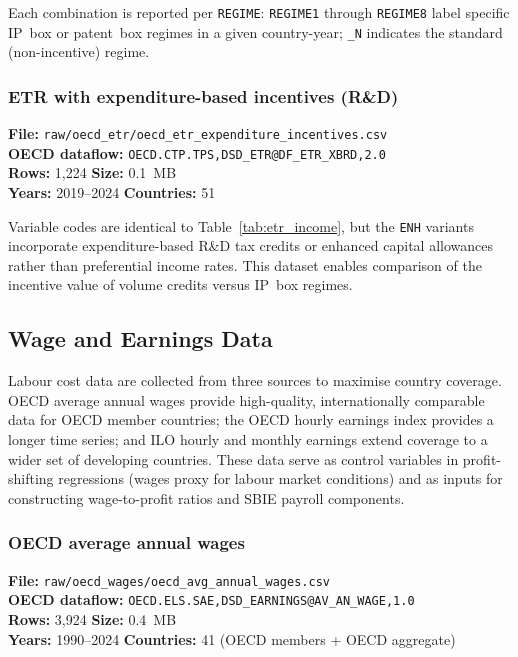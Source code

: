 \documentclass[11pt,a4paper]{article}
\begin{document}
Each combination is reported per \texttt{REGIME}: \texttt{REGIME1} through \texttt{REGIME8} label specific IP~box or patent~box regimes in a given country-year; \texttt{\_N} indicates the standard (non-incentive) regime.

\subsubsection{ETR with expenditure-based incentives (R\&D)}

\textbf{File:} \texttt{raw/oecd\_etr/oecd\_etr\_expenditure\_incentives.csv}\\
\textbf{OECD dataflow:} \texttt{OECD.CTP.TPS,DSD\_ETR@DF\_ETR\_XBRD,2.0}\\
\textbf{Rows:} 1{,}224 \quad \textbf{Size:} 0.1~MB\\
\textbf{Years:} 2019--2024 \quad \textbf{Countries:} 51

Variable codes are identical to Table~\ref{tab:etr_income}, but the \texttt{ENH} variants incorporate expenditure-based R\&D tax credits or enhanced capital allowances rather than preferential income rates.  This dataset enables comparison of the incentive value of volume credits versus IP~box regimes.



\subsection{Wage and Earnings Data}\label{sec:wages}

Labour cost data are collected from three sources to maximise country coverage. OECD average annual wages provide high-quality, internationally comparable data for OECD member countries; the OECD hourly earnings index provides a longer time series; and ILO hourly and monthly earnings extend coverage to a wider set of developing countries.  These data serve as control variables in profit-shifting regressions (wages proxy for labour market conditions) and as inputs for constructing wage-to-profit ratios and SBIE payroll components.

\subsubsection{OECD average annual wages}

\textbf{File:} \texttt{raw/oecd\_wages/oecd\_avg\_annual\_wages.csv}\\
\textbf{OECD dataflow:} \texttt{OECD.ELS.SAE,DSD\_EARNINGS@AV\_AN\_WAGE,1.0}\\
\textbf{Rows:} 3{,}924 \quad \textbf{Size:} 0.4~MB\\
\textbf{Years:} 1990--2024 \quad \textbf{Countries:} 41 (OECD members + OECD aggregate)
\end{document}
